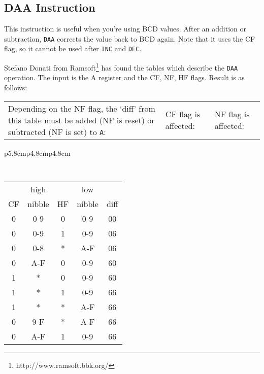\documentclass[12pt,twoside,openright,a4paper]{book}
\begin{document}
\subsection{DAA Instruction}
\label{daa}

This instruction is useful when you're using BCD values. After an addition or subtraction, {\tt DAA} corrects the value back to BCD again.  Note that it uses the CF flag, so it cannot be used after {\tt INC} and {\tt DEC}.

Stefano Donati from Ramsoft\footnote{http://www.ramsoft.bbk.org/} has found the tables which describe the {\tt DAA} operation. The input is the A register and the CF, NF, HF flags. Result is as follows:

{
	\footnotesize

	\begin{tabular}{b{5.8cm}b{4.8cm}b{4.8cm}}
		Depending on the NF flag, the `diff' from this table must be added (NF is reset) or subtracted (NF is set) to {\tt A}:
		&
		CF flag is affected:
		&
		NF flag is affected: \\
	\end{tabular}

	\begin{tabular}{p{5.8cm}p{4.8cm}p{4.8cm}}

		{\tt
			\begin{tabular}[t]{c|c|c|c|c}
				   &  high   &    & low    &  \\
				CF &  nibble & HF & nibble & diff \\
				\hline
				0 & 0-9     &  0 & 0-9    &  00  \\
				0 & 0-9     &  1 & 0-9    &  06  \\
				0 & 0-8     &  * & A-F    &  06  \\
				0 & A-F     &  0 & 0-9    &  60  \\
				1 &  *      &  0 & 0-9    &  60  \\
				1 &  *      &  1 & 0-9    &  66  \\
				1 &  *      &  * & A-F    &  66  \\
				0 & 9-F     &  * & A-F    &  66  \\
				0 & A-F     &  1 & 0-9    &  66  \\
				\hline
			\end{tabular}
		}


\end{tabular}}
\end{document}

